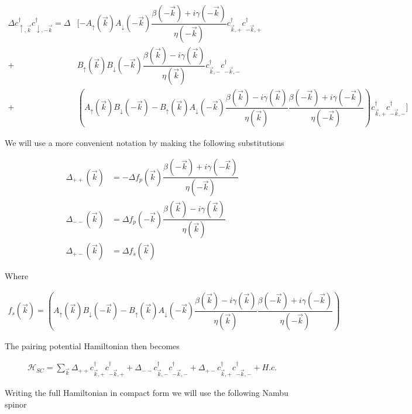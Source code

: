 \begin{equation}
  \begin{split}
    \Delta c_{\uparrow,\vec{k}}^{\dagger}c_{\downarrow,-\vec{k}}^{\dagger}  = \Delta &[ -A_{\uparrow}(\vec{k})A_{\downarrow}(-\vec{k})\dfrac{\beta(-\vec{k})+i\gamma(-\vec{k})}{\eta(-\vec{k})}c_{\vec{k},+}^{\dagger}c_{-\vec{k},+}^{\dagger} \\
    + & B_{\uparrow}(\vec{k})B_{\downarrow}(-\vec{k})\dfrac{\beta(\vec{k})-i\gamma(\vec{k})}{\eta(\vec{k})}c_{\vec{k},-}^{\dagger}c_{-\vec{k},-}^{\dagger}  \\
  +&\left(A_{\uparrow}(\vec{k})B_{\downarrow}(-\vec{k})-B_{\uparrow}(\vec{k})A_{\downarrow}(-\vec{k})\dfrac{\beta(\vec{k})-i\gamma(\vec{k})}{\eta(\vec{k})}\dfrac{\beta(-\vec{k})+i\gamma(-\vec{k})}{\eta(-\vec{k})} \right) c_{\vec{k},+}^{\dagger}c_{-\vec{k},-}^{\dagger} ]
  \end{split}
\end{equation}

We will use a more convenient notation by making the following substitutions

\begin{align}
  \Delta_{++}(\vec{k}) &= -\Delta f_p(\vec{k}) \dfrac{\beta(-\vec{k}) +i\gamma(-\vec{k})}{\eta(-\vec{k})} \\
  \Delta_{--}(\vec{k}) &= \Delta f_p(-\vec{k}) \dfrac{\beta(\vec{k}) -i\gamma(\vec{k})}{\eta(\vec{k})} \\
  \Delta_{+-}(\vec{k}) &= \Delta f_s(\vec{k})
\end{align}

Where 

\begin{align}
  f_s(\vec{k}) = \left(A_{\uparrow}(\vec{k})B_{\downarrow}(-\vec{k})-B_{\uparrow}(\vec{k})A_{\downarrow}(-\vec{k})\dfrac{\beta(\vec{k})-i\gamma(\vec{k})}{\eta(\vec{k})}\dfrac{\beta(-\vec{k})+i\gamma(-\vec{k})}{\eta(-\vec{k})} \right)
\end{align}

The pairing potential Hamiltonian then becomes

\begin{align}
  \mathcal{H}_{SC} = \sum\limits_{\vec{k}} \Delta_{++}c_{\vec{k},+}^{\dagger}c_{-\vec{k},+}^{\dagger} + \Delta_{--}c_{\vec{k},-}^{\dagger}c_{-\vec{k},-}^{\dagger} +\Delta_{+-}c_{\vec{k},+}^{\dagger}c_{-\vec{k},-}^{\dagger} + H.c.
\end{align}

Writing the full Hamiltonian in compact form we will use the following Nambu spinor

